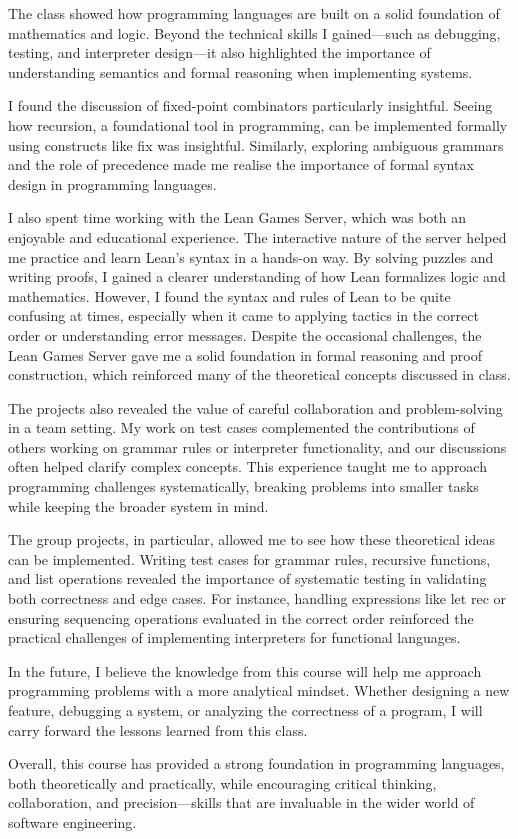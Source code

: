 \documentclass{article}
\theoremstyle{theorem}
\theoremstyle{definition}
\theoremstyle{remark}
\begin{document}
The class showed how programming languages are built on a solid foundation of mathematics and logic. Beyond the technical skills I gained—such as debugging, testing, and interpreter design—it also highlighted the importance of understanding semantics and formal reasoning when implementing systems.

I found the discussion of fixed-point combinators particularly insightful. Seeing how recursion, a foundational tool in programming, can be implemented formally using constructs like fix was insightful. Similarly, exploring ambiguous grammars and the role of precedence made me realise the importance of formal syntax design in programming languages.

I also spent time working with the Lean Games Server, which was both an enjoyable and educational experience. The interactive nature of the server helped me practice and learn Lean's syntax in a hands-on way. By solving puzzles and writing proofs, I gained a clearer understanding of how Lean formalizes logic and mathematics. However, I found the syntax and rules of Lean to be quite confusing at times, especially when it came to applying tactics in the correct order or understanding error messages. Despite the occasional challenges, the Lean Games Server gave me a solid foundation in formal reasoning and proof construction, which reinforced many of the theoretical concepts discussed in class.

The projects also revealed the value of careful collaboration and problem-solving in a team setting. My work on test cases complemented the contributions of others working on grammar rules or interpreter functionality, and our discussions often helped clarify complex concepts. This experience taught me to approach programming challenges systematically, breaking problems into smaller tasks while keeping the broader system in mind.

The group projects, in particular, allowed me to see how these theoretical ideas can be implemented. Writing test cases for grammar rules, recursive functions, and list operations revealed the importance of systematic testing in validating both correctness and edge cases. For instance, handling expressions like let rec or ensuring sequencing operations evaluated in the correct order reinforced the practical challenges of implementing interpreters for functional languages.

In the future, I believe the knowledge from this course will help me approach programming problems with a more analytical mindset. Whether designing a new feature, debugging a system, or analyzing the correctness of a program, I will carry forward the lessons learned from this class.

Overall, this course has provided a strong foundation in programming languages, both theoretically and practically, while encouraging critical thinking, collaboration, and precision—skills that are invaluable in the wider world of software engineering.
\end{document}
